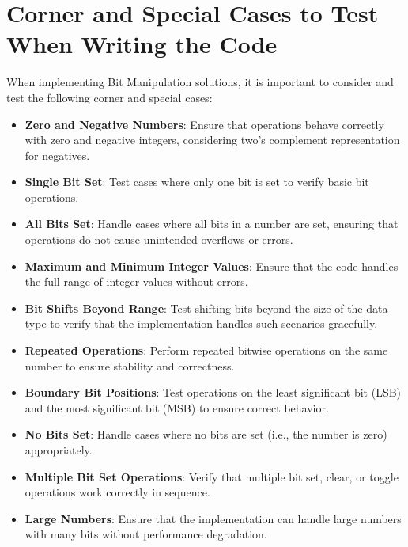 \section*{Corner and Special Cases to Test When Writing the Code}

When implementing Bit Manipulation solutions, it is important to consider and test the following corner and special cases:

\begin{itemize}
    \item \textbf{Zero and Negative Numbers}: Ensure that operations behave correctly with zero and negative integers, considering two's complement representation for negatives.
    
    \item \textbf{Single Bit Set}: Test cases where only one bit is set to verify basic bit operations.
    
    \item \textbf{All Bits Set}: Handle cases where all bits in a number are set, ensuring that operations do not cause unintended overflows or errors.
    
    \item \textbf{Maximum and Minimum Integer Values}: Ensure that the code handles the full range of integer values without errors.
    
    \item \textbf{Bit Shifts Beyond Range}: Test shifting bits beyond the size of the data type to verify that the implementation handles such scenarios gracefully.
    
    \item \textbf{Repeated Operations}: Perform repeated bitwise operations on the same number to ensure stability and correctness.
    
    \item \textbf{Boundary Bit Positions}: Test operations on the least significant bit (LSB) and the most significant bit (MSB) to ensure correct behavior.
    
    \item \textbf{No Bits Set}: Handle cases where no bits are set (i.e., the number is zero) appropriately.
    
    \item \textbf{Multiple Bit Set Operations}: Verify that multiple bit set, clear, or toggle operations work correctly in sequence.
    
    \item \textbf{Large Numbers}: Ensure that the implementation can handle large numbers with many bits without performance degradation.
\end{itemize}

